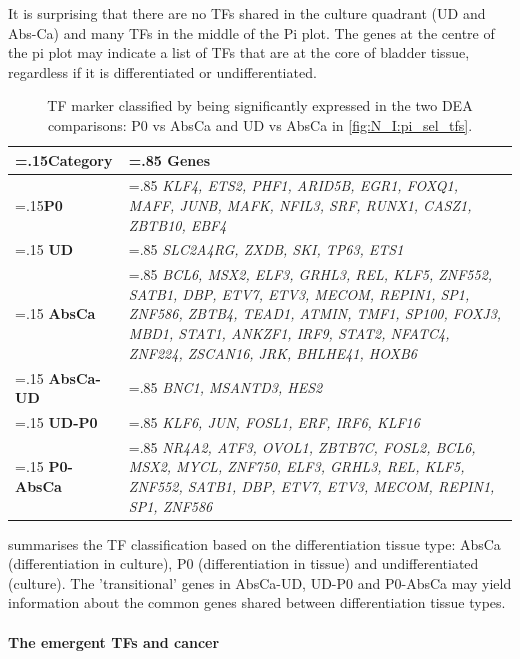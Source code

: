 It is surprising that there are no TFs shared in the culture quadrant (UD and Abs-Ca) and many TFs in the middle of the Pi plot. The genes at the centre of the pi plot may indicate a list of TFs that are at the core of bladder tissue, regardless if it is differentiated or undifferentiated.

\begin{table}[H]
  \centering
  \scriptsize
  \begin{tabularx}{\textwidth}{>{\hsize=.15\hsize}X|>{\hsize=.85\hsize}X}
    \toprule
    \textbf{Category} & \textbf{Genes} \\
    \midrule
    \textbf{P0} & \textit{KLF4, ETS2, PHF1, ARID5B, EGR1, FOXQ1, MAFF, JUNB, MAFK, NFIL3, SRF, RUNX1, CASZ1, ZBTB10, EBF4} \\
    \midrule
    \textbf{UD} & \textit{SLC2A4RG, ZXDB, SKI, TP63, ETS1} \\
    \midrule
    \textbf{AbsCa} & \textit{BCL6, MSX2, ELF3, GRHL3, REL, KLF5, ZNF552, SATB1, DBP, ETV7, ETV3, MECOM, REPIN1, SP1, ZNF586, ZBTB4, TEAD1, ATMIN, TMF1, SP100, FOXJ3, MBD1, STAT1, ANKZF1, IRF9, STAT2, NFATC4, ZNF224, ZSCAN16, JRK, BHLHE41, HOXB6} \\
    \midrule
    \textbf{AbsCa-UD} & \textit{BNC1, MSANTD3, HES2} \\
    \midrule
    \textbf{UD-P0} & \textit{KLF6, JUN, FOSL1, ERF, IRF6, KLF16} \\
    \midrule
    \textbf{P0-AbsCa} & \textit{NR4A2, ATF3, OVOL1, ZBTB7C, FOSL2, BCL6, MSX2, MYCL, ZNF750, ELF3, GRHL3, REL, KLF5, ZNF552, SATB1, DBP, ETV7, ETV3, MECOM, REPIN1, SP1, ZNF586} \\
    \bottomrule
  \end{tabularx}
  \caption{TF marker classified by being significantly expressed in the two DEA comparisons: P0 vs AbsCa and UD vs AbsCa in \cref{fig:N_I:pi_sel_tfs}.} 
  \label{tab:N_I:markers_diff}
\end{table}

 summarises the TF classification based on the differentiation tissue type: AbsCa (differentiation in culture), P0 (differentiation in tissue) and undifferentiated (culture). The 'transitional' genes in AbsCa-UD, UD-P0 and P0-AbsCa may yield information about the common genes shared between differentiation tissue types.


\paragraph*{The emergent TFs and cancer} \label{s:N_I:sel_tfs_cancer}


